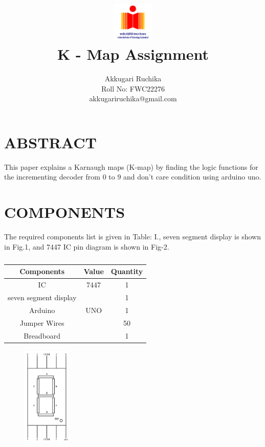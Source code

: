 \documentclass[conference]{IEEEtran}
\title{
\vspace{1cm}
{\includegraphics[width=0.15\textwidth]{iithlogo.jpg} \\ K - Map Assignment} }
\author{Akkugari Ruchika \\ Roll No: FWC22276 \\ akkugariruchika@gmail.com}
\begin{document}
\maketitle
 \section {ABSTRACT}
 This paper explains a Karnaugh maps (K-map) by finding the logic functions for the incrementing decoder from $0$ to $9$ and don't care condition using arduino uno.

\section{COMPONENTS}
The required components list is given in Table: I., seven segment display is shown in Fig.1, and 7447 IC pin diagram is shown in Fig-2.
\vspace{0.3cm}
 \begin{table} [htbp]
\centering
\begin{tabular}{| c | c | c |} \hline
Components & Value & Quantity \\\hline
IC & 7447 & 1 \\ \hline
seven segment display & & 1\\ \hline
Arduino & UNO & 1 \\ \hline
Jumper Wires &  & 50 \\ \hline
Breadboard & & 1 \\ 
\hline
\end{tabular}
\vspace{0.3cm}
\caption{\label{tab:widgets}}
\end{table}

\begin{figure}[h]                           
\centering                                 
\includegraphics[width=0.2\textwidth]{fig1.jpg}                                           
\caption{\label{fig-1:Gates}}               
\end{figure}
\end{document}
